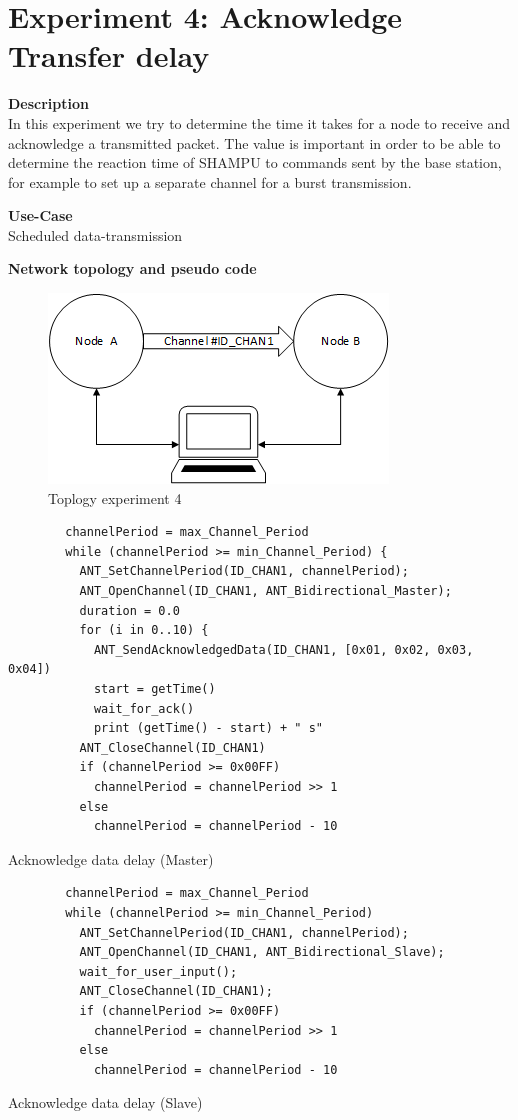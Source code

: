 \section{Experiment 4: Acknowledge Transfer delay}
\begin{description} 
	\item{\textbf{Description}} \hfill \\ In this experiment we try to determine the time it takes for a node to receive and acknowledge a transmitted packet. The value is important in order to be able to determine the reaction time of SHAMPU to commands sent by the base station, for example to set up a separate channel for a burst transmission.
	\item{\textbf{Use-Case}} \hfill \\ Scheduled data-transmission
	\item{\textbf{Network topology and pseudo code}} \hfill \\ 
	\begin{figure}[H]
		\centering
		\includegraphics[scale=1]{content/images/exp_topo.png}
		\caption{Toplogy experiment 4}
	\end{figure}
	\begin{code}[H]
		\begin{verbatim}
		channelPeriod = max_Channel_Period
		while (channelPeriod >= min_Channel_Period) {
		  ANT_SetChannelPeriod(ID_CHAN1, channelPeriod);
		  ANT_OpenChannel(ID_CHAN1, ANT_Bidirectional_Master);
		  duration = 0.0
		  for (i in 0..10) {
		    ANT_SendAcknowledgedData(ID_CHAN1, [0x01, 0x02, 0x03, 0x04])
		    start = getTime()	   
		    wait_for_ack()		
		    print (getTime() - start) + " s"	  
		  ANT_CloseChannel(ID_CHAN1)		
		  if (channelPeriod >= 0x00FF)
		    channelPeriod = channelPeriod >> 1
		  else
		    channelPeriod = channelPeriod - 10
		\end{verbatim}
		\caption{Acknowledge data delay (Master)}\label{lst:mExp4}
	\end{code}
	
	\begin{code}[H]
		\begin{verbatim}
		channelPeriod = max_Channel_Period
		while (channelPeriod >= min_Channel_Period)
		  ANT_SetChannelPeriod(ID_CHAN1, channelPeriod);
		  ANT_OpenChannel(ID_CHAN1, ANT_Bidirectional_Slave);				 
		  wait_for_user_input();
		  ANT_CloseChannel(ID_CHAN1);
		  if (channelPeriod >= 0x00FF)
		    channelPeriod = channelPeriod >> 1
		  else
		    channelPeriod = channelPeriod - 10
		\end{verbatim}
		\caption{Acknowledge data delay (Slave)}\label{lst:sExp4}
	\end{code}
	

\end{description}
